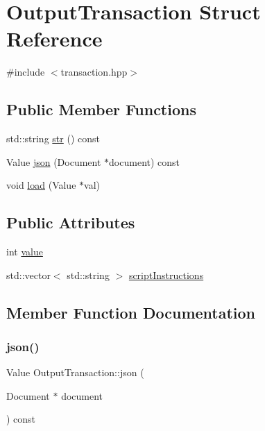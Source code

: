 \hypertarget{structOutputTransaction}{}\section{Output\+Transaction Struct Reference}
\label{structOutputTransaction}


{\ttfamily \#include $<$transaction.\+hpp$>$}

\subsection*{Public Member Functions}
\begin{DoxyCompactItemize}
\item 
std\+::string \mbox{\hyperlink{structOutputTransaction_a8491046e882593572512bf7717c36285}{str}} () const
\item 
Value \mbox{\hyperlink{structOutputTransaction_aa68e74419b5d85bcfa550ffbbe8a3287}{json}} (Document $\ast$document) const
\item 
void \mbox{\hyperlink{structOutputTransaction_a51ddd6b77522fa6fa676c00add6d6e1a}{load}} (Value $\ast$val)
\end{DoxyCompactItemize}
\subsection*{Public Attributes}
\begin{DoxyCompactItemize}
\item 
int \mbox{\hyperlink{structOutputTransaction_a938dbaea39f3d053581d744e21281ad4}{value}}
\item 
std\+::vector$<$ std\+::string $>$ \mbox{\hyperlink{structOutputTransaction_a32dcca6abe10eba274ba85f3460ceb84}{script\+Instructions}}
\end{DoxyCompactItemize}


\subsection{Member Function Documentation}
\mbox{\label{structOutputTransaction_aa68e74419b5d85bcfa550ffbbe8a3287}} 
\subsubsection{\texorpdfstring{json()}{json()}}
{\footnotesize\ttfamily Value Output\+Transaction\+::json (\begin{DoxyParamCaption}\item[{Document $\ast$}]{document }\end{DoxyParamCaption}) const}

